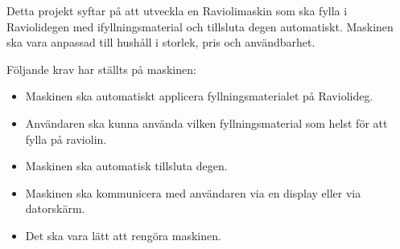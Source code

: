 Detta projekt syftar på att utveckla en Raviolimaskin som ska fylla i Raviolidegen med ifyllningsmaterial och tillsluta degen automatiskt. Maskinen ska vara anpassad till hushåll i storlek, pris och användbarhet.

Följande krav har ställts på maskinen:

\begin{itemize}
	\item Maskinen ska automatiskt applicera fyllningsmaterialet på Raviolideg.
	\item Användaren ska kunna använda vilken fyllningsmaterial som helst för att fylla på raviolin.
	\item Maskinen ska automatisk tillsluta degen.
	\item Maskinen ska kommunicera med användaren via en display eller via datorskärm.
	\item Det ska vara lätt att rengöra maskinen.	
\end{itemize}
